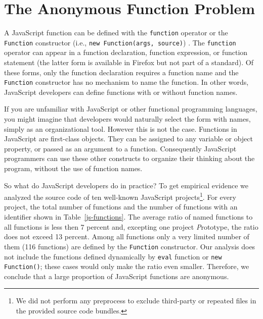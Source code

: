 \documentclass[10pt, preprint]{sigplanconf}
\begin{document}
\section{The Anonymous Function Problem}

A JavaScript function can be defined with the {\small\texttt{function}} operator or the {\small\texttt{Function}} constructor (i.e., {\small\texttt{new Function(args, source)}}) \cite{ECMA}. The {\small\texttt{function}} operator can appear in a function declaration, function expression, or function statement (the latter form is available in Firefox but not part of a standard).  Of these forms, only the function declaration requires a function name and the {\small\texttt{Function}} constructor has no mechanism to name the function.  In other words, JavaScript developers can define functions with or without function names.

If you are unfamiliar with JavaScript or other functional programming languages, you might imagine that developers would naturally select the form with names, simply as an organizational tool. However this is not the case. Functions in JavaScript are first-class objects. They can be assigned to any variable or object property, or passed as an argument to a function. Consequently JavaScript programmers can use these other constructs to organize their thinking about the program, without the use of function names.

So what do JavaScript developers do in practice?  To get empirical evidence we analyzed the source code of ten well-known JavaScript projects\footnote[2]{We did not perform any preprocess to exclude third-party or repeated files in the provided source code bundles.}. For every project, the total number of functions and the number of functions with an identifier shown in Table~\ref{js-functions}. The average ratio of named functions to all functions is less then 7 percent and, excepting one project {\textit Prototype}, the ratio does not exceed 13 percent. Among all functions only a very limited number of them (116 functions) are defined by the {\small\texttt{Function}} constructor. Our analysis does not include the functions defined dynamically by {\small\texttt{eval}} function or {\small\texttt{new Function()}}; these cases would only make the ratio even smaller.  Therefore, we conclude that a large proportion of JavaScript functions are anonymous.
\end{document}
